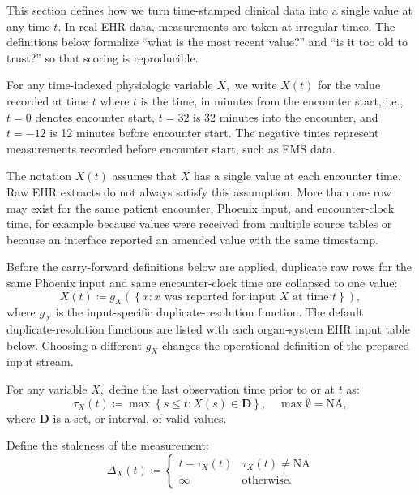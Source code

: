 \documentclass[letterpaper,10pt]{article}
\begin{document}
This section defines how we turn time-stamped clinical data into a
single value at any time $t$. In real EHR data, measurements are taken
at irregular times. The definitions below formalize ``what is the most
recent value?'' and ``is it too old to trust?'' so that scoring is
reproducible.

For any time-indexed physiologic variable $X,$ we write $X(t)$ for the value
recorded at time $t$ where $t$ is the time, in minutes from the encounter start,
i.e., $t=0$ denotes encounter start, $t=32$ is 32 minutes into the encounter,
and $t=-12$ is 12 minutes before encounter start. The negative times represent
measurements recorded before encounter start, such as EMS data.

The notation $X(t)$ assumes that $X$ has a single value at each encounter time.
Raw EHR extracts do not always satisfy this assumption. More than one row may
exist for the same patient encounter, Phoenix input, and encounter-clock time,
for example because values were received from multiple source tables or because
an interface reported an amended value with the same timestamp.

Before the carry-forward definitions below are applied, duplicate raw rows for
the same Phoenix input and same encounter-clock time are collapsed to one value:
\begin{equation}
  \label{eq:duplicate-resolution}
  X(t) \coloneqq g_X\left(\left\{x : x \text{ was reported for input } X
  \text{ at time } t\right\}\right),
\end{equation}
where $g_X$ is the input-specific duplicate-resolution function. The default
duplicate-resolution functions are listed with each organ-system EHR input
table below. Choosing a different $g_X$ changes the operational definition
of the prepared input stream.

For any variable $X,$ define the last observation time prior to or at
$t$ as:
\begin{equation}
  \label{eq:tau}
  \tau_{X}(t) \coloneqq \max\left\{s \leq t : X(s) \in \boldsymbol{D}\right\},
  \quad \max \emptyset = \mathrm{NA},
\end{equation}
where $\boldsymbol{D}$ is a set, or interval, of valid values.

Define the staleness of the measurement:
\begin{equation}
  \label{eq:staleness}
  \Delta_{X}(t) \coloneqq
    \begin{cases}
      t - \tau_{X}(t) & \tau_X(t) \neq \mathrm{NA} \\
      \infty & \text{otherwise.}
    \end{cases}
\end{equation}
\end{document}
